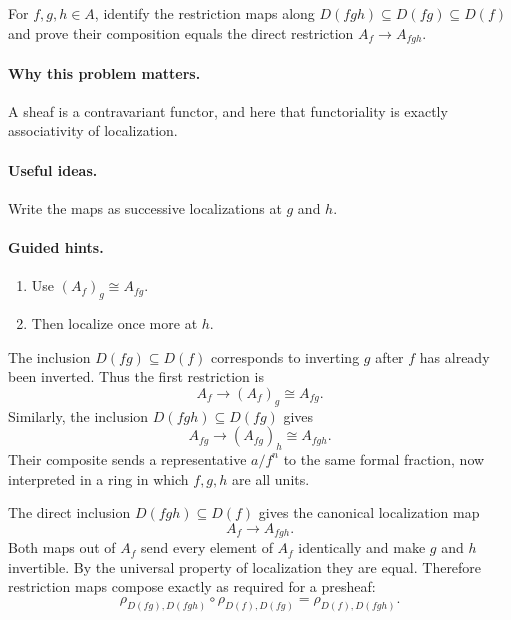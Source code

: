 \begin{problem}\label{prob:vi17-p13}
For $f,g,h\in A$, identify the restriction maps along $D(fgh)\subseteq D(fg)\subseteq D(f)$ and prove their composition equals the direct restriction $A_f\to A_{fgh}$.
\end{problem}

\ifdefined\FullProblemDossiers
\paragraph{Why this problem matters.}
A sheaf is a contravariant functor, and here that functoriality is exactly associativity of localization.

\paragraph{Useful ideas.}
Write the maps as successive localizations at $g$ and $h$.

\paragraph{Guided hints.}
\begin{enumerate}
\item Use $(A_f)_g\cong A_{fg}$.
\item Then localize once more at $h$.
\end{enumerate}

\begin{solution}
The inclusion $D(fg)\subseteq D(f)$ corresponds to inverting $g$ after $f$ has already been inverted.  Thus the first restriction is
\[
A_f\longrightarrow (A_f)_g\cong A_{fg}.
\]
Similarly, the inclusion $D(fgh)\subseteq D(fg)$ gives
\[
A_{fg}\longrightarrow (A_{fg})_h\cong A_{fgh}.
\]
Their composite sends a representative $a/f^n$ to the same formal fraction, now interpreted in a ring in which $f,g,h$ are all units.

The direct inclusion $D(fgh)\subseteq D(f)$ gives the canonical localization map
\[
A_f\longrightarrow A_{fgh}.
\]
Both maps out of $A_f$ send every element of $A_f$ identically and make $g$ and $h$ invertible.  By the universal property of localization they are equal.  Therefore restriction maps compose exactly as required for a presheaf:
\[
\rho_{D(fg),D(fgh)}\circ\rho_{D(f),D(fg)}
=
\rho_{D(f),D(fgh)}.
\]
\end{solution}



